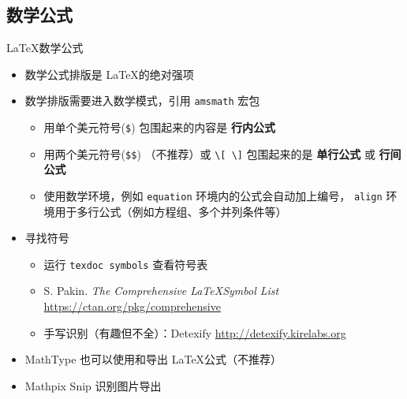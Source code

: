     \subsection{数学公式}
    \begin{frame}[fragile]{\LaTeX 数学公式}
        \begin{itemize}
        \item 数学公式排版是 \LaTeX 的绝对强项
        \item 数学排版需要进入数学模式，引用 \texttt{amsmath} 宏包
            \begin{itemize}
            \item 用单个美元符号(\verb|$|) 包围起来的内容是 {\bf 行内公式}
          \item 用两个美元符号(\verb|$$|) （不推荐）或 \verb|\[ \]| 包围起来的是 {\bf 单行公式} 或 {\bf 行间公式}
            \item 使用数学环境，例如 \texttt{equation} 环境内的公式会自动加上编号，
                \texttt{align} 环境用于多行公式（例如方程组、多个并列条件等）
          \end{itemize}
        \item 寻找符号
            \begin{itemize}
              \item 运行 \texttt{texdoc symbols} 查看符号表
              \item S. Pakin. \emph{The Comprehensive \LaTeX Symbol List}
                    \url{https://ctan.org/pkg/comprehensive}
              \item 手写识别（有趣但不全）：Detexify \url{http://detexify.kirelabs.org}
            \end{itemize}
        \item MathType 也可以使用和导出 \LaTeX 公式（不推荐）
        \item Mathpix Snip 识别图片导出
        \end{itemize}
        \end{frame}
    
